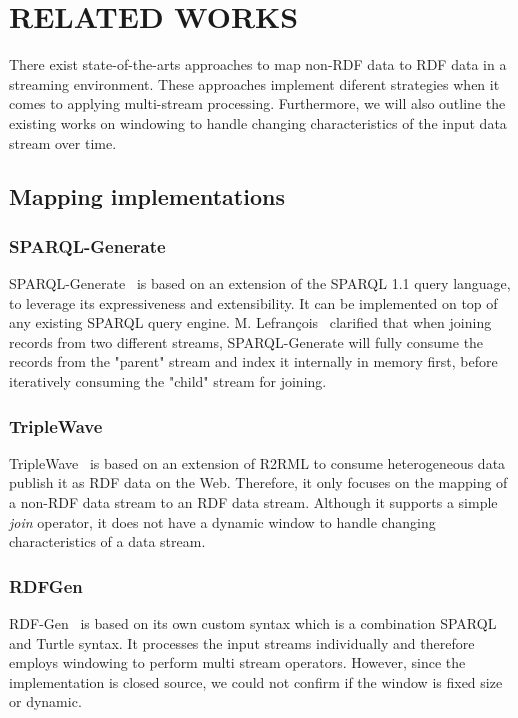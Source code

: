\section{RELATED WORKS} 
\label{sec:RELATED WORKS} 
There exist state-of-the-arts approaches to map non-RDF data 
to RDF data in a streaming environment. These approaches 
implement diferent strategies when it comes to applying 
multi-stream processing. Furthermore, we will also outline
the existing works on windowing to handle changing characteristics 
of the input data stream over time. 

\subsection{Mapping implementations}
\subsubsection{SPARQL-Generate} 
SPARQL-Generate~\cite{sparql_generate} 
is based on an extension of the SPARQL 1.1 query language, to leverage 
its expressiveness and extensibility. 
It can be implemented on top 
of any existing SPARQL query engine. 
M. Lefran\c{c}ois~\cite{sparql_generate} clarified that when joining
records from two different streams, SPARQL-Generate will fully consume the records 
from the "parent" stream and index it internally in memory first, before 
iteratively consuming the "child" stream for joining. 

\subsubsection{TripleWave} 
TripleWave~\cite{triple_wave}  is based on an extension of 
R2RML to consume heterogeneous data publish it as RDF data on the Web. 
Therefore, it only focuses on the mapping of a non-RDF data stream to an RDF data stream. 
Although it supports a simple \emph{join} operator, it does not have a 
dynamic window to handle changing characteristics of a data stream.

\subsubsection{RDFGen}
RDF-Gen~\cite{rdf_gen} is based on its own custom syntax 
which is a combination SPARQL and Turtle syntax. It processes the input streams 
individually and therefore employs windowing to perform multi stream operators. 
However, since the implementation is closed source, we could not confirm if 
the window is fixed size or dynamic. 

